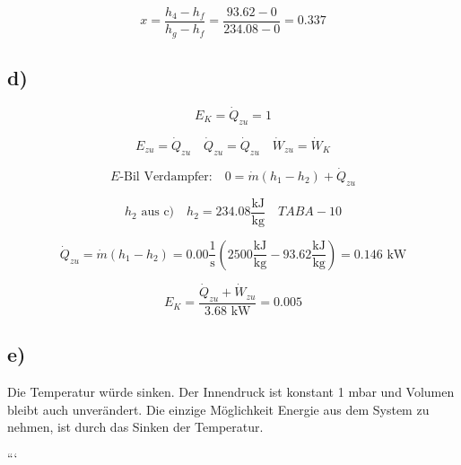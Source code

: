 \[
x = \frac{h_4 - h_f}{h_g - h_f} = \frac{93.62 - 0}{234.08 - 0} = 0.337
\]

\subsection*{d)}

\[
E_K = \dot{Q}_{zu} = 1
\]

\[
E_{zu} = \dot{Q}_{zu} \quad \dot{Q}_{zu} = \dot{Q}_{zu} \quad \dot{W}_{zu} = \dot{W}_K
\]

\[
E\text{-Bil Verdampfer:} \quad 0 = \dot{m} (h_1 - h_2) + \dot{Q}_{zu}
\]

\[
h_2 \text{ aus c)} \quad h_2 = 234.08 \frac{\text{kJ}}{\text{kg}} \quad TAB A-10
\]

\[
\dot{Q}_{zu} = \dot{m} (h_1 - h_2) = 0.00 \frac{1}{\text{s}} (2500 \frac{\text{kJ}}{\text{kg}} - 93.62 \frac{\text{kJ}}{\text{kg}}) = 0.146 \text{ kW}
\]

\[
E_K = \frac{\dot{Q}_{zu} + \dot{W}_{zu}}{3.68 \text{ kW}} = 0.005
\]

\subsection*{e)}

Die Temperatur würde sinken. Der Innendruck ist konstant 1 mbar und Volumen bleibt auch unverändert. Die einzige Möglichkeit Energie aus dem System zu nehmen, ist durch das Sinken der Temperatur.

```